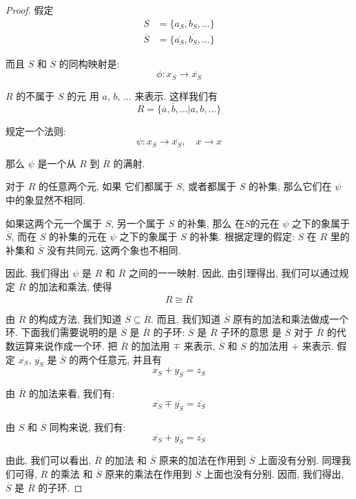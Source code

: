 \documentclass[utf8]{ctexbook}
\begin{document}
\begin{proof}
假定
\begin{align*}
S & = \{a_S, b_S, \ldots \} \\
\overline{S} & = \{ \overline{a_S}, \overline{b_S}, \ldots \}
\end{align*}

而且 $S$ 和 $\overline{S}$ 的同构映射是:
$$ \phi : x_S \longrightarrow \overline{x_S} $$

$R$ 的不属于 $S$ 的元 用 $a$, $b$, $\ldots$ 来表示. 这样我们有
\begin{equation}
R = \{ \overline{a}, \overline{b}, \ldots | a, b, \ldots \}
\end{equation}

规定一个法则:
\begin{equation}
\psi : x_S \longrightarrow \overline{x_S}, \quad x \longrightarrow x 
\end{equation}

那么 $\psi$ 是一个从 $R$ 到 $\overline{R}$ 的满射. 

对于 $R$ 的任意两个元, 如果 它们都属于 $S$, 或者都属于 $S$ 的补集, 那么它们在 $\psi$ 中的象显然不相同.

如果这两个元一个属于 $S$, 另一个属于 $S$ 的补集, 那么 在$S$的元在 $\psi$ 之下的象属于 $\overline{S}$, 而在 $S$ 的补集的元在 $\psi$ 之下的象属于 $S$ 的补集. 根据定理的假定: $S$ 在 $R$ 里的补集和 $\overline{S}$ 没有共同元, 这两个象也不相同.

因此, 我们得出 $\psi$ 是 $R$ 和 $\overline{R}$ 之间的一一映射. 因此, 由引理得出, 我们可以通过规定 $\overline{R}$ 的加法和乘法, 使得
\begin{equation}
R \cong \overline{R} \nonumber
\end{equation}

由 $\overline{R}$ 的构成方法, 我们知道 $\overline{S} \subseteq \overline{R}$. 而且, 我们知道 $\overline{S}$ 原有的加法和乘法做成一个环. 下面我们需要说明的是 $\overline{S}$ 是 $\overline{R}$ 的子环: $\overline{S}$ 是 $\overline{R}$ 子环的意思 是 $\overline{S}$ 对于 $\overline{R}$ 的代数运算来说作成一个环. 把 $\overline{R}$ 的加法用 $\mp$ 来表示, $\overline{S}$ 和 $S$ 的加法用 $+$ 来表示. 假定 $\overline{x_S}$, $\overline{y_S}$ 是 $\overline{S}$ 的两个任意元, 并且有
\begin{equation}
x_S + y_S = z_S 
\end{equation}

由 $\overline{R}$ 的加法来看, 我们有:
\begin{equation}
\overline{x_S} \mp \overline{y_S} = \overline{z_S}
\end{equation}

由 $S$ 和 $\overline{S}$ 同构来说, 我们有:
\begin{equation}
\overline{x_S} + \overline{y_S} = \overline{z_S}
\end{equation}

由此, 我们可以看出, $\overline{R}$ 的加法 和 $\overline{S}$ 原来的加法在作用到 $\overline{S}$ 上面没有分别. 同理我们可得, $\overline{R}$ 的乘法 和 $\overline{S}$ 原来的乘法在作用到 $\overline{S}$ 上面也没有分别. 因而, 我们得出, $\overline{S}$ 是 $\overline{R}$ 的子环.
\end{proof}
\end{document}
